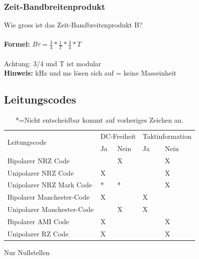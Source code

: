 \subsubsection{Zeit-Bandbreitenprodukt}
Wie gross ist das Zeit-Bandbreitenprodukt B\tau ?\\
\\
\textbf{Formel:} $B\tau=\frac{3}{4}*\frac{1}{T}*\frac{3}{4}*T$
\\
\\
Achtung: 3/4 und T ist modular
\\
\textbf{Hinweis:} kHz und ms lösen sich auf = keine Masseinheit

\subsection{Leitungscodes}

\begin{table}[h!]
\centering
\begin{tabular}{|l|l|l|l|l|}
\hline
\multirow{2}{*}{Leitungscode} & \multicolumn{2}{l|}{DC-Freiheit} & \multicolumn{2}{l|}{Taktinformation} \\ \cline{2-5} 
                              & Ja             & Nein            & Ja               & Nein              \\ \hline
Bipolarer NRZ Code            &                & X               &                  & X                 \\ \hline
Unipolarer NRZ Code           & X               &                &                 &  X                 \\ \hline
Unipolarer NRZ Mark Code      & *              &  *               &                 &  X                 \\ \hline
Bipolarer Manchester-Code     & X              &                 & X                &                   \\ \hline
Unipolarer Manchester-Code    &               &  X               & X                &                   \\ \hline
Bipolarer AMI Code            & X              &                 &                 &  X                 \\ \hline
Unipolarer RZ Code			 &	X			  & 			   & 				&	X				\\ \hline
\end{tabular}
\caption{Nur Nullstellen}
\caption{*=Nicht entscheidbar kommt auf vorheriges Zeichen an.}
\end{table}

